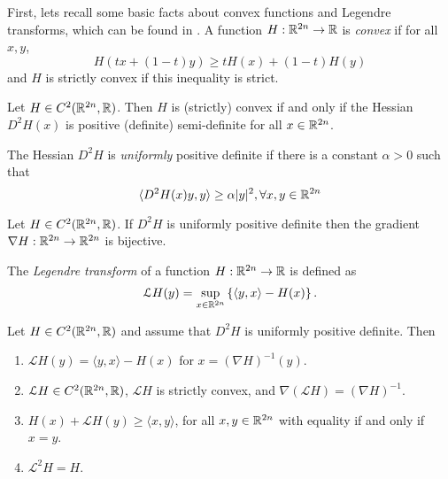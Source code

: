 \documentclass[../capacities_main.tex]{subfiles}
\begin{document}
	
	
	First, lets recall some basic facts about convex functions and Legendre transforms, which can be found in \cite{amann}. A function $H: {\mathbb R}^{2n} \rightarrow {\mathbb R}$ is \emph{convex} if for all $x,y$, 
	\begin{equation*}
	H(tx+(1-t)y) \geq tH(x) + (1-t)H(y)
	\end{equation*}
	and $H$ is strictly convex if this inequality is strict.
	
	\begin{Proposition}
		Let $H \in C^2({\mathbb R}^{2n},{\mathbb R})$. Then $H$ is (strictly) convex if and only if the Hessian $D^2H(x)$ is positive (definite) semi-definite for all $x\in {\mathbb R}^{2n}$.
	\end{Proposition}
	
	The Hessian $D^2H$ is \emph{uniformly} positive definite if there is a constant $\alpha>0$ such that 
	\begin{equation*}
	\langle D^2H(x)y,y\rangle \geq \alpha|y|^2, \forall x,y \in {\mathbb R}^{2n}
	\end{equation*}
	
	\begin{Proposition}
		Let $H \in C^2({\mathbb R}^{2n},{\mathbb R})$. If $D^2H$ is uniformly positive definite then the gradient $\nabla H: {\mathbb R}^{2n} \rightarrow {\mathbb R}^{2n}$ is bijective. 
	\end{Proposition}
	The \emph{Legendre transform} of a function $H:{\mathbb R}^{2n} \rightarrow {\mathbb R}$ is defined as
	\begin{equation*}
	\mathcal{L}H(y) = \sup_{x\in {\mathbb R}^{2n}}\left\{ \langle y,x\rangle - H(x)\right\}.
	\end{equation*}
	\begin{Proposition}\label{amann}
		Let $H \in C^2({\mathbb R}^{2n},{\mathbb R})$ and assume that $D^2H$ is uniformly positive definite. Then
		\begin{enumerate}
			\item $\mathcal{L}H(y) = \langle y,x\rangle - H(x)$ for $x = (\nabla H)^{-1}(y)$.
			\item $\mathcal{L}H \in C^2({\mathbb R}^{2n},{\mathbb R})$, $\mathcal{L}H$ is strictly convex, and $\nabla (\mathcal{L}H) = (\nabla H)^{-1}$.
			\item $H(x) + \mathcal{L}H(y) \geq \langle x,y\rangle$, for all $x,y\in {\mathbb R}^{2n}$ with equality if and only if $x=y$.
			\item $\mathcal{L}^2H = H$.
		\end{enumerate}
	\end{Proposition}
	
\end{document}
